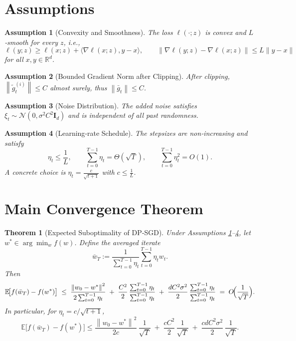 \documentclass[11pt]{article}
\newtheorem{theorem}{Theorem}
\newtheorem{assumption}{Assumption}
\newcommand{\E}{\mathbb{E}}
\newcommand{\R}{\mathbb{R}}
\newcommand{\norm}[1]{\left\lVert#1\right\rVert}
\newcommand{\ip}[2]{\langle #1,#2\rangle}
\newcommand{\grad}{\nabla}
\begin{document}
\newpage
\section*{Assumptions}
\begin{assumption}[Convexity and Smoothness]\label{ass:convex-smooth}
The loss $\ell(\cdot;z)$ is convex and $L$‑smooth for every $z$, i.e.,
\[
\ell(y;z)\ge \ell(x;z)+\ip{\grad\ell(x;z)}{y-x},\qquad
\|\grad\ell(y;z)-\grad\ell(x;z)\|\le L\|y-x\|
\]
for all $x,y\in\R^{d}$.
\end{assumption}
\begin{assumption}[Bounded Gradient Norm after Clipping]\label{ass:bounded}
After clipping, $\norm{\tilde g_t^{(i)}}\le C$ almost surely, thus $\norm{\bar g_t}\le C$.
\end{assumption}
\begin{assumption}[Noise Distribution]\label{ass:noise}
The added noise satisfies $\xi_t\sim\mathcal N(0,\sigma^{2}C^{2}\mathbf I_d)$ and is independent of all past randomness.
\end{assumption}
\begin{assumption}[Learning‑rate Schedule]\label{ass:lr}
The stepsizes are non‑increasing and satisfy
\[
\eta_t\le \frac{1}{L},\qquad \sum_{t=0}^{T-1}\eta_t = \Theta(\sqrt{T}),\qquad
\sum_{t=0}^{T-1}\eta_t^{2}=O(1).
\]
A concrete choice is $\eta_t=\frac{c}{\sqrt{t+1}}$ with $c\le \frac{1}{L}$.
\end{assumption}

\section*{Main Convergence Theorem}
\begin{theorem}[Expected Suboptimality of DP‑SGD]\label{thm:main}
Under Assumptions \ref{ass:convex-smooth}–\ref{ass:lr}, let $w^{*}\in\arg\min_{w}f(w)$. Define the averaged iterate
\[
\bar w_T:=\frac{1}{\sum_{t=0}^{T-1}\eta_t}\sum_{t=0}^{T-1}\eta_t w_t .
\]
Then
\[
\E\!\bigl[f(\bar w_T)-f(w^{*})\bigr]\;\le\;
\frac{\norm{w_0-w^{*}}^{2}}{2\sum_{t=0}^{T-1}\eta_t}
\;+\;
\frac{C^{2}}{2}\,\frac{\sum_{t=0}^{T-1}\eta_t}{\sum_{t=0}^{T-1}\eta_t}
\;+\;
\frac{dC^{2}\sigma^{2}}{2}\,\frac{\sum_{t=0}^{T-1}\eta_t}{\sum_{t=0}^{T-1}\eta_t}
\;=\;
O\!\Bigl(\frac{1}{\sqrt{T}}\Bigr).
\]
In particular, for $\eta_t=c/\sqrt{t+1}$,
\[
\E\!\bigl[f(\bar w_T)-f(w^{*})\bigr]\le
\frac{\norm{w_0-w^{*}}^{2}}{2c}\,\frac{1}{\sqrt{T}}
\;+\;
\frac{cC^{2}}{2}\,\frac{1}{\sqrt{T}}
\;+\;
\frac{c d C^{2}\sigma^{2}}{2}\,\frac{1}{\sqrt{T}} .
\]
\end{theorem}
\end{document}
